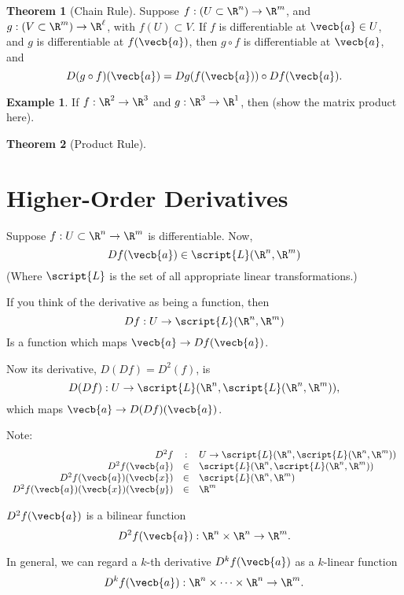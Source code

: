 \documentclass[a5paper]{article}
\theoremstyle{definition}%
\newtheorem{theorem}{Theorem}
\newtheorem*{example*}{Example}
\numberwithin{exercise}{section}
\theoremstyle{remark}%
\begin{document}
\begin{highlight}
\begin{theorem}[Chain Rule]
Suppose $f:(U\subset\R^n)\to\R^m$, and $g:(V\subset\R^m)\to\R^\ell$, with $f(U)\subset V$. If $f$ is differentiable at $\vecb{a}\in U$, and $g$ is differentiable at $f(\vecb{a})$, then $g \circ f$ is differentiable at $\vecb{a}$, and 
$$D(g\circ f)(\vecb{a})=Dg(f(\vecb{a}))\circ Df(\vecb{a}).$$ 
\end{theorem}
\end{highlight}

\begin{example*}
If $f:\R^2\to \R^3$ and $g:\R^3\to \R^1$, then 
(show the matrix product here).
\end{example*}

\begin{highlight}
\begin{theorem}[Product Rule]

\end{theorem}
\end{highlight}

\section{Higher-Order Derivatives}
\begin{highlight}
Suppose $f:U\subset \R^n\to \R^m$ is differentiable. Now, 
$$Df(\vecb{a})\in \script{L}(\R^n, \R^m)$$ (Where $\script{L}$ is the set of all appropriate linear transformations.)

If you think of the derivative as being a function, then 
$$Df:U\to \script{L}(\R^n, \R^m)$$
Is a function which maps $\vecb{a}\to Df(\vecb{a})$. 

Now its derivative, $D(Df)=D^2(f)$, is 
$$D(Df):U\to \script{L}(\R^n, \script{L}(\R^n, \R^m)),$$
which maps $\vecb{a}\to D(Df)(\vecb{a})$. 
\end{highlight}
Note:
\[\begin{array}{rcl}
D^2f &:& U \to \script{L}(\R^n, \script{L}(\R^n, \R^m))\\
D^2f(\vecb{a}) &\in& \script{L}(\R^n, \script{L}(\R^n, \R^m))\\
D^2f(\vecb{a})(\vecb{x}) &\in& \script{L}(\R^n, \R^m)\\
D^2f(\vecb{a})(\vecb{x})(\vecb{y}) &\in& \R^m
\end{array}\]

\begin{highlight}
$D^2f(\vecb{a})$ is a bilinear function 
$$D^2f(\vecb{a}):\R^n\times \R^n \to \R^m.$$

In general, we can regard a $k$-th derivative $D^kf(\vecb{a})$ as a $k$-linear function
$$D^kf(\vecb{a}) : \R^n\times\cdots\times \R^n\to \R^m.$$
\end{highlight}
\end{document}
